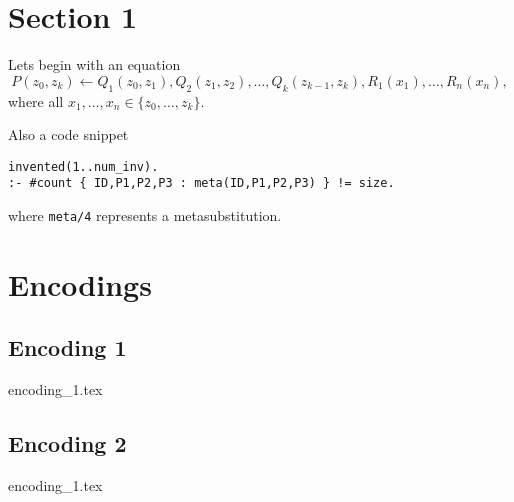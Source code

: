 
\section{Section 1}
\label{sec:impl_1}

Lets begin with an equation
\begin{equation}
\label{eq:forward_chained_rule}
P(z_0,z_k) \leftarrow Q_1(z_0,z_1), Q_2(z_1,z_2), \dots, Q_k(z_{k-1},z_k), R_1(x_1), \dots,  R_n(x_n),
\end{equation}
where all $x_1, \dots, x_n \in \{z_0, \dots, z_k\}$.

Also a code snippet
\begin{verbatim}
invented(1..num_inv).
:- #count { ID,P1,P2,P3 : meta(ID,P1,P2,P3) } != size.
\end{verbatim}
where \verb|meta/4| represents a metasubstitution.

\section{Encodings}
\subsection{Encoding 1}
{encoding_1.tex}
\subsection{Encoding 2}
{encoding_1.tex}
